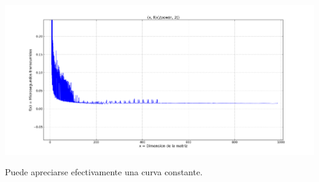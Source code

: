 \begin{center}
\includegraphics[scale=0.450]{img/golosa_fx2.png}
\end{center}
\vspace{2mm}

Puede apreciarse efectivamente una curva constante.
